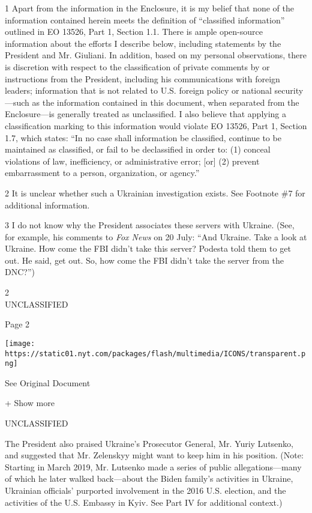 1 Apart from the information in the Enclosure, it is my belief that none
of the information contained herein meets the definition of ``classified
information'' outlined in EO 13526, Part 1, Section 1.1. There is ample
open-source information about the efforts I describe below, including
statements by the President and Mr. Giuliani. In addition, based on my
personal observations, there is discretion with respect to the
classification of private comments by or instructions from the
President, including his communications with foreign leaders;
information that is not related to U.S. foreign policy or national
security---such as the information contained in this document, when
separated from the Enclosure---is generally treated as unclassified. I
also believe that applying a classification marking to this information
would violate EO 13526, Part 1, Section 1.7, which states: ``In no case
shall information be classified, continue to be maintained as
classified, or fail to be declassified in order to: (1) conceal
violations of law, inefficiency, or administrative error; {[}or{]} (2)
prevent embarrassment to a person, organization, or agency.''

2 It is unclear whether such a Ukrainian investigation exists. See
Footnote \#7 for additional information.

3 I do not know why the President associates these servers with Ukraine.
(See, for example, his comments to \emph{Fox News} on 20 July: ``And
Ukraine. Take a look at Ukraine. How come the FBI didn't take this
server? Podesta told them to get out. He said, get out. So, how come the
FBI didn't take the server from the DNC?'')

2\\
UNCLASSIFIED

Page 2

\protect\hyperlink{}{}

\texttt{[image: https://static01.nyt.com/packages/flash/multimedia/ICONS/transparent.png]}

See Original Document

+ Show more

UNCLASSIFIED

The President also praised Ukraine's Prosecutor General, Mr. Yuriy
Lutsenko, and suggested that Mr. Zelenskyy might want to keep him in his
position. (Note: Starting in March 2019, Mr. Lutsenko made a series of
public allegations---many of which he later walked back---about the
Biden family's activities in Ukraine, Ukrainian officials' purported
involvement in the 2016 U.S. election, and the activities of the U.S.
Embassy in Kyiv. See Part IV for additional context.)

